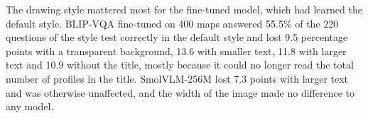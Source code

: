 The drawing style mattered most for the fine-tuned model, which had learned the default style. BLIP-VQA fine-tuned on 400 maps answered 55.5\% of the 220 questions of the style test correctly in the default style and lost 9.5 percentage points with a transparent background, 13.6 with smaller text, 11.8 with larger text and 10.9 without the title, mostly because it could no longer read the total number of profiles in the title. SmolVLM-256M lost 7.3 points with larger text and was otherwise unaffected, and the width of the image made no difference to any model.
